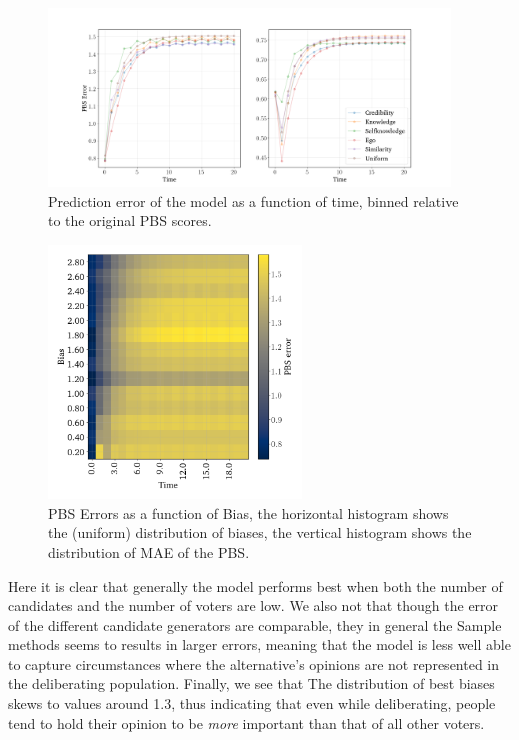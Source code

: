 \begin{figure}
	\begin{center}
		\includegraphics[width=0.95\textwidth]{Figures/errors_binned.png}
	\end{center}
	\caption{Prediction error of the model as a function of time, binned relative to the original PBS scores.}\label{fig:binned_errors}
\end{figure}


\begin{figure}
	\centering

	\includegraphics[width=0.6\textwidth]{Figures/bias_time_imshow.png}
	\hspace{1em}
	\caption{PBS Errors as a function of Bias, the horizontal histogram shows the (uniform) distribution of biases, the vertical histogram shows the distribution of MAE of the PBS.}\label{fig:bias_over_time}
\end{figure}


Here it is clear that generally the model performs best when both the number of
candidates and the number of voters are low. We also not that though the error
of the different candidate generators are comparable, they in general the
Sample methods seems to results in larger errors, meaning that the model is
less well able to capture circumstances where the alternative's opinions are
not represented in the deliberating population. Finally, we see that The
distribution of best biases skews to values around 1.3, thus indicating that
even while deliberating, people tend to hold their opinion to be \textit{more}
important than that of all other voters.

